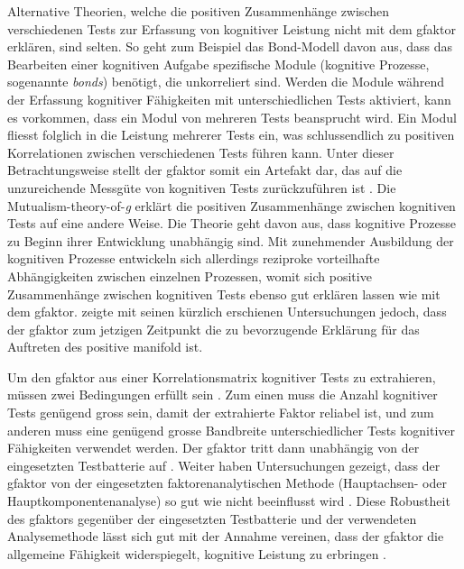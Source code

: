 \documentclass[11pt, twoside, a4paper]{book}		%
\begin{document}
Alternative Theorien, welche die positiven Zusammenhänge zwischen verschiedenen Tests zur Erfassung von kognitiver Leistung nicht mit dem \gls{gfaktor} erklären, sind selten. 
So geht zum Beispiel das Bond-Modell \citep{Thomson1916} davon aus, dass das Bearbeiten einer kognitiven Aufgabe spezifische Module (kognitive Prozesse, sogenannte \textit{bonds}) benötigt, die unkorreliert sind. Werden die Module während der Erfassung kognitiver Fähigkeiten mit unterschiedlichen Tests aktiviert, kann es vorkommen, dass ein Modul von mehreren Tests beansprucht wird. Ein Modul fliesst folglich in die Leistung mehrerer Tests ein, was schlussendlich zu positiven Korrelationen zwischen verschiedenen Tests führen kann. Unter dieser Betrachtungsweise stellt der \gls{gfaktor} somit ein Artefakt dar, das auf die unzureichende Messgüte von kognitiven Tests zurückzuführen ist \citep[für eine Gegenüberstellung zwischen dem \gls{gfaktor} und dem Bond-Modell siehe][]{Bartholomew2013}.
Die Mutualism-theory-of-\textit{g} \citep{VanDerMaas2006} erklärt die positiven Zusammenhänge zwischen kognitiven Tests auf eine andere Weise. Die Theorie geht davon aus, dass kognitive Prozesse zu Beginn ihrer Entwicklung unabhängig sind. Mit zunehmender Ausbildung der kognitiven Prozesse entwickeln sich allerdings reziproke vorteilhafte Abhängigkeiten zwischen einzelnen Prozessen, womit sich positive Zusammenhänge zwischen kognitiven Tests ebenso gut erklären lassen wie mit dem \gls{gfaktor}. \citet{Gignac2014, Gignac2016} zeigte mit seinen kürzlich erschienen Untersuchungen jedoch, dass der \gls{gfaktor} zum jetzigen Zeitpunkt die zu bevorzugende Erklärung für das Auftreten des positive man\-i\-fold ist. 

Um den \gls{gfaktor} aus einer Korrelationsmatrix kognitiver Tests zu extrahieren, müssen zwei Bedingungen erfüllt sein \citep[][S. 73]{Jensen1998a}. Zum einen muss die Anzahl kognitiver Tests genügend gross sein, damit der extrahierte Faktor reliabel ist, und zum anderen muss eine genügend grosse Bandbreite unterschiedlicher Tests kognitiver Fähigkeiten verwendet werden. Der \gls{gfaktor} tritt dann unabhängig von der eingesetzten Testbatterie auf \citep{Johnson2004, Johnson2008}. Weiter haben Untersuchungen gezeigt, dass der \gls{gfaktor} von der eingesetzten faktorenanalytischen Methode (Hauptachsen- oder Hauptkomponentenanalyse) so gut wie nicht beeinflusst wird \citep{Jensen1994, Ree1991}.
Diese Robustheit des \gls{gfaktor}s gegenüber der eingesetzten Testbatterie und der verwendeten Analysemethode lässt sich gut mit der Annahme vereinen, dass der \gls{gfaktor} die allgemeine Fähigkeit widerspiegelt, kognitive Leistung zu erbringen \citep{Spearman1904, Spearman1927}.
\end{document}

